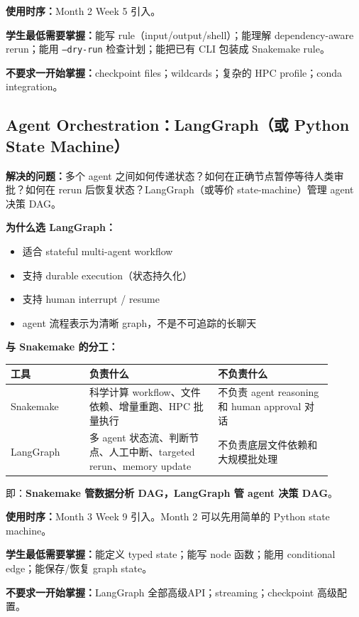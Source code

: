 \documentclass[11pt,a4paper,fontset=fandol]{ctexart}
\begin{document}
\textbf{使用时序：}Month 2 Week 5 引入。

\textbf{学生最低需要掌握：}能写 rule（input/output/shell）；能理解 dependency-aware rerun；能用 \texttt{--dry-run} 检查计划；能把已有 CLI 包装成 Snakemake rule。

\textbf{不要求一开始掌握：}checkpoint files；wildcards；复杂的 HPC profile；conda integration。

\subsection{Agent Orchestration：LangGraph（或 Python State Machine）}

\textbf{解决的问题：}多个 agent 之间如何传递状态？如何在正确节点暂停等待人类审批？如何在 rerun 后恢复状态？LangGraph（或等价 state-machine）管理 agent 决策 DAG。

\textbf{为什么选 LangGraph：}
\begin{itemize}
  \item 适合 stateful multi-agent workflow
  \item 支持 durable execution（状态持久化）
  \item 支持 human interrupt / resume
  \item agent 流程表示为清晰 graph，不是不可追踪的长聊天
\end{itemize}

\textbf{与 Snakemake 的分工：}
\begin{center}
\begin{tabular}{p{0.22\linewidth}p{0.36\linewidth}p{0.32\linewidth}}
\toprule
工具 & 负责什么 & 不负责什么 \\
\midrule
Snakemake & 科学计算 workflow、文件依赖、增量重跑、HPC 批量执行 & 不负责 agent reasoning 和 human approval 对话 \\
LangGraph & 多 agent 状态流、判断节点、人工中断、targeted rerun、memory update & 不负责底层文件依赖和大规模批处理 \\
\bottomrule
\end{tabular}
\end{center}

即：\textbf{Snakemake 管数据分析 DAG，LangGraph 管 agent 决策 DAG}。

\textbf{使用时序：}Month 3 Week 9 引入。Month 2 可以先用简单的 Python state machine。

\textbf{学生最低需要掌握：}能定义 typed state；能写 node 函数；能用 conditional edge；能保存/恢复 graph state。

\textbf{不要求一开始掌握：}LangGraph 全部高级API；streaming；checkpoint 高级配置。
\end{document}
